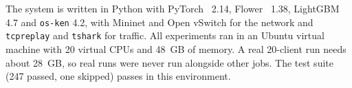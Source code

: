 The system is written in Python with PyTorch~\cite{paszke2019} 2.14, Flower~\cite{beutel2020} 1.38, LightGBM 4.7 and \texttt{os-ken} 4.2, with Mininet and Open vSwitch for the network and \texttt{tcpreplay} and \texttt{tshark} for traffic. All experiments ran in an Ubuntu virtual machine with 20 virtual CPUs and 48~GB of memory. A real 20-client run needs about 28~GB, so real runs were never run alongside other jobs. The test suite (247 passed, one skipped) passes in this environment.
